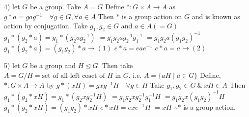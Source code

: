 4) let $G$ be a group. Take $A = G$
Define $*: G \times A \to A$ as
$g * a = gag^{-1} \quad \forall g \in G, \forall a \in A$
Then $*$ is a group action on $G$ and is known as action by conjugation.
Take $g_1, g_2 \in G$ and $a \in A(=G)$
$g_1 * (g_2 * a) = g_1 * (g_2 a g_2^{-1})$
$= g_1 g_2 a g_2^{-1} g_1^{-1}$
$= g_1 g_2 a (g_1 g_2)^{-1}$
$g_1 * (g_2 * a) = (g_1 g_2) * a \longrightarrow (1)$
$e * a = eae^{-1}$
$e * a = a \longrightarrow (2)$

5) let $G$ be a group and $H \trianglelefteq G$. Then take
$A = G/H = \text{set of all left coset of } H \text{ in } G$.
i.e. $A = \{aH \mid a \in G\}$
Define, $*: G \times A \to A$ by
$g * (xH) = gxg^{-1} H \quad \forall g \in H$
Take $g_1, g_2 \in G \ \& \ xH \in A$
Then $g_1 * (g_2 * xH) = g_1 * (g_2 x g_2^{-1} H)$
$= g_1 g_2 x g_2^{-1} g_1^{-1} H$
$= g_1 g_2 x (g_1 g_2)^{-1} H$
$g_1 * (g_2 * xH) = (g_1 g_2) * xH$
$e * xH = exe^{-1} H$
$= xH$
$\therefore *$ is a group action.
